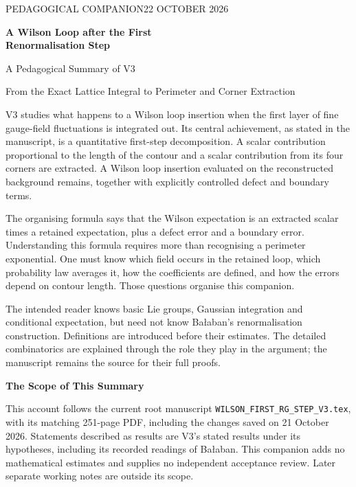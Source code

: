 \documentclass[11pt,a4paper]{article}
\newcommand{\subhead}[1]{\par\vspace{4pt}\textbf{\color{ink}#1}\par}
\begin{document}
\thispagestyle{empty}
{\small\color{muted}PEDAGOGICAL COMPANION\hfill 22 OCTOBER 2026\par}
\vspace{23pt}
{\Huge\bfseries\color{ink}A Wilson Loop after the First\\[5pt]Renormalisation Step\par}
\vspace{13pt}
{\LARGE A Pedagogical Summary of V3\par}
\vspace{15pt}
{\large From the Exact Lattice Integral to Perimeter and Corner Extraction\par}
\vspace{23pt}

V3 studies what happens to a Wilson loop insertion when the first layer of fine gauge-field fluctuations is integrated out. Its central achievement, as stated in the manuscript, is a quantitative first-step decomposition. A scalar contribution proportional to the length of the contour and a scalar contribution from its four corners are extracted. A Wilson loop insertion evaluated on the reconstructed background remains, together with explicitly controlled defect and boundary terms.

The organising formula says that the Wilson expectation is an extracted scalar times a retained expectation, plus a defect error and a boundary error.
Understanding this formula requires more than recognising a perimeter exponential. One must know which field occurs in the retained loop, which probability law averages it, how the coefficients are defined, and how the errors depend on contour length. Those questions organise this companion.

The intended reader knows basic Lie groups, Gaussian integration and conditional expectation, but need not know Ba{\l}aban's renormalisation construction. Definitions are introduced before their estimates. The detailed combinatorics are explained through the role they play in the argument; the manuscript remains the source for their full proofs.

\subhead{The Scope of This Summary}
This account follows the current root manuscript \texttt{WILSON\_FIRST\_RG\_STEP\_V3.tex}, with its matching 251-page PDF, including the changes saved on 21 October 2026. Statements described as results are V3's stated results under its hypotheses, including its recorded readings of Ba{\l}aban. This companion adds no mathematical estimates and supplies no independent acceptance review. Later separate working notes are outside its scope.
\end{document}

